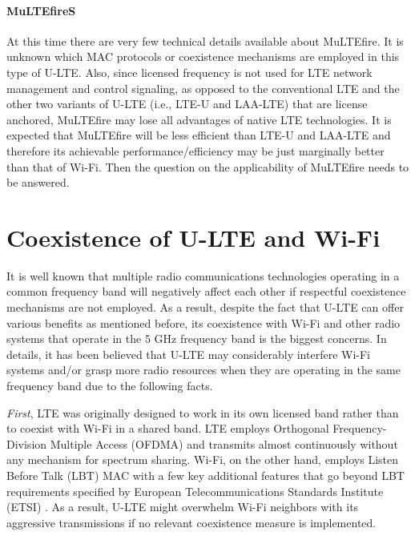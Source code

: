 \paragraph{MuLTEfireS}

At this time there are very few technical details available about MuLTEfire. It is unknown which MAC protocols or coexistence mechanisms are employed in this type of U-LTE. Also, since licensed frequency is not used for LTE network management and control signaling, as opposed to the conventional LTE and the other two variants of U-LTE (i.e., LTE-U and LAA-LTE) that are license anchored, MuLTEfire may lose all advantages of native LTE technologies. It is expected that MuLTEfire will be less efficient than LTE-U and LAA-LTE and therefore its achievable performance/efficiency may be just marginally better than that of Wi-Fi. Then the question on the applicability of MuLTEfire needs to be answered.

\section{Coexistence of U-LTE and Wi-Fi}
\label{coexist}
It is well known that multiple radio communications technologies operating in a common frequency band will negatively affect each other if respectful coexistence mechanisms are not employed. As a result, despite the fact that U-LTE can offer various benefits as mentioned before, its coexistence with Wi-Fi and other radio systems that operate in the $5$ GHz frequency band is the biggest concerns. In details, it has been believed that U-LTE may considerably interfere Wi-Fi systems and/or grasp more radio resources when they are operating in the same frequency band due to the following facts.

\textit{First}, LTE was originally designed to work in its own licensed band rather than to coexist with Wi-Fi in a shared band. LTE employs Orthogonal Frequency-Division Multiple Access (OFDMA) and transmits almost continuously without any mechanism for spectrum sharing. Wi-Fi, on the other hand, employs Listen Before Talk (LBT) MAC with a few key additional features that go beyond LBT requirements specified by European Telecommunications Standards Institute (ETSI) \cite{LBT-ETSI-2014}. As a result, U-LTE might overwhelm Wi-Fi neighbors with its aggressive transmissions if no relevant coexistence measure is implemented.

